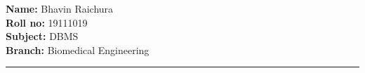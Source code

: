 \documentclass[10pt,a4paper,twoside]{article}
\begin{document}
\begin{center}
\vspace{.3cm}
{\bf {\huge  }}
\vspace{.3cm}
\end{center}
{\bf Name:}  Bhavin Raichura\\
{\bf Roll no:}  19111019 \\
{\bf Subject:}  DBMS\\
{\bf Branch: }  Biomedical Engineering \hspace{\fill}   \\
\hrule

\vspace{.5cm}
\vspace{.4cm}

\renewcommand{\abstractname}{Abstract}

\begin{abstract}

\end{abstract}
\end{document}
